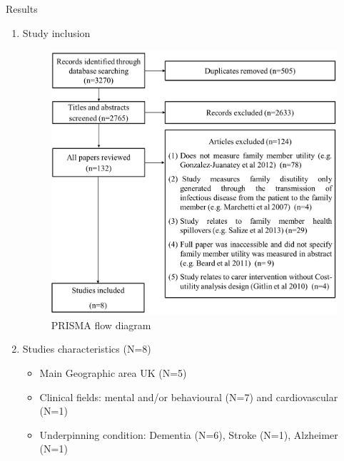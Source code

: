 \documentclass[final]{beamer}
\newlength{\onecolwid}
\begin{document}
\begin{frame}[t]
\begin{columns}[t]
\begin{column}{\onecolwid}
\begin{columns}
\begin{column}{\onecolwid}
\vspace{-1.0cm}
\begin{block}{Results}
\vspace{-1.0cm}
\begin{enumerate}
    \item Study inclusion
\begin{figure}
\includegraphics[width=1.0\linewidth]{prisma2.png}
\vspace{-0.1cm}
\caption{PRISMA flow diagram}
\end{figure}

\vspace{-1.0cm}
\item Studies characteristics (N=8)
    \begin{itemize}
    \item \justifying Main Geographic area UK (N=5)
    \item Clinical fields: mental and/or behavioural (N=7) and cardiovascular (N=1)
    \item  Underpinning condition: Dementia (N=6), Stroke (N=1), Alzheimer (N=1)
    \end{itemize}
\end{enumerate}


\end{block}
\end{column}
\end{columns}
\end{column}
\end{columns}
\end{frame}
\end{document}
